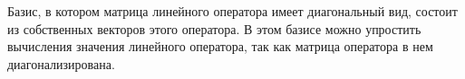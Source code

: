 
Базис, в котором матрица линейного оператора имеет диагональный вид,
состоит из собственных векторов этого оператора.
В этом базисе можно упростить вычисления значения линейного оператора,
так как матрица оператора в нем диагонализирована.
